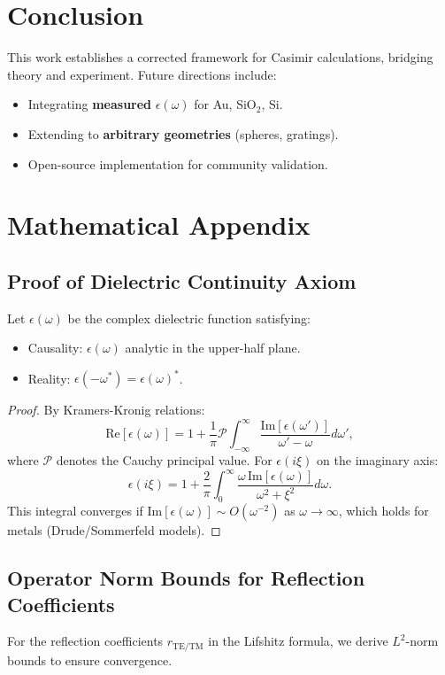 \documentclass{article}
\begin{document}
\section{Conclusion}
This work establishes a corrected framework for Casimir calculations, bridging theory and experiment. Future directions include:
\begin{itemize}
    \item Integrating \textbf{measured} \(\epsilon(\omega)\) for Au, SiO\(_2\), Si.
    \item Extending to \textbf{arbitrary geometries} (spheres, gratings).
    \item Open-source implementation for community validation.
\end{itemize}

\section*{Mathematical Appendix}
\subsection{Proof of Dielectric Continuity Axiom}
Let \(\epsilon(\omega)\) be the complex dielectric function satisfying:
\begin{itemize}
    \item Causality: \(\epsilon(\omega)\) analytic in the upper-half plane.
    \item Reality: \(\epsilon(-\omega^*) = \epsilon(\omega)^*\).
\end{itemize}

\begin{proof}
By Kramers-Kronig relations:
\[
\text{Re}[\epsilon(\omega)] = 1 + \frac{1}{\pi} \mathcal{P} \int_{-\infty}^\infty \frac{\text{Im}[\epsilon(\omega')]}{\omega' - \omega} d\omega',
\]
where \(\mathcal{P}\) denotes the Cauchy principal value. For \(\epsilon(i\xi)\) on the imaginary axis:
\[
\epsilon(i\xi) = 1 + \frac{2}{\pi} \int_0^\infty \frac{\omega \, \text{Im}[\epsilon(\omega)]}{\omega^2 + \xi^2} d\omega.
\]
This integral converges if \(\text{Im}[\epsilon(\omega)] \sim O(\omega^{-2})\) as \(\omega \to \infty\), which holds for metals (Drude/Sommerfeld models).
\end{proof}

\subsection{Operator Norm Bounds for Reflection Coefficients}
For the reflection coefficients \(r_\text{TE/TM}\) in the Lifshitz formula, we derive \(L^2\)-norm bounds to ensure convergence.
\end{document}
